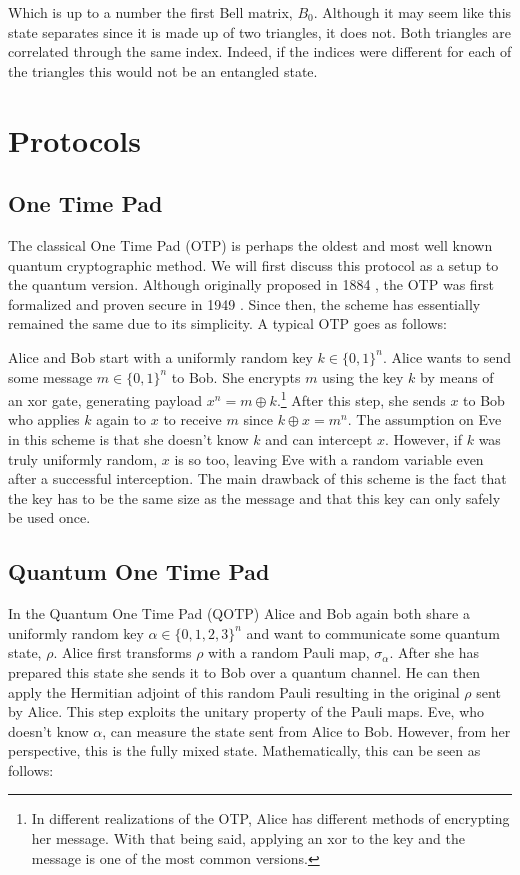 \documentclass[]{article}
\begin{document}
Which is up to a number the first Bell matrix, $B_0$. Although it may seem like this state separates since it is made up of two triangles, it does not. Both triangles are correlated through the same index. Indeed, if the indices were different for each of the triangles this would not be an entangled state.

\section{Protocols}


\subsection{One Time Pad}

The classical One Time Pad (OTP) is perhaps the oldest and most well known quantum cryptographic method. We will first discuss this protocol as a setup to the quantum version. Although originally proposed in 1884 \cite{Markoff2011}, the OTP was first formalized and proven secure in 1949 \cite{Shannon1949}. Since then, the scheme has essentially remained the same due to its simplicity. A typical OTP goes as follows:

Alice and Bob start with a uniformly random key $k \in \{0,1\}^n$. Alice wants to send some message $m \in \{0,1\}^n$ to Bob. She encrypts $m$ using the key $k$ by means of an xor gate, generating payload $x^n = m \oplus k$.\footnote{In different realizations of the OTP, Alice has different methods of encrypting her message. With that being said, applying an xor to the key and the message is one of the most common versions.} After this step, she sends $x$ to Bob who applies $k$ again to $x$ to receive $m$ since $k \oplus x = m^n$. The assumption on Eve in this scheme is that she doesn't know $k$ and can intercept $x$. However, if $k$ was truly uniformly random, $x$ is so too, leaving Eve with a random variable even after a successful interception. The main drawback of this scheme is the fact that the key has to be the same size as the message and that this key can only safely be used once.

\subsection{Quantum One Time Pad}

In the Quantum One Time Pad (QOTP) Alice and Bob again both share a uniformly random key $ \alpha \in \{0,1,2,3\}^n$ and want to communicate some quantum state, $\rho$. Alice first transforms $\rho$ with a random Pauli map, $\sigma_\alpha$. After she has prepared this state she sends it to Bob over a quantum channel. He can then apply the Hermitian adjoint of this random Pauli resulting in the original $\rho$ sent by Alice. This step exploits the unitary property of the Pauli maps. Eve, who doesn't know $\alpha$, can measure the state sent from Alice to Bob. However, from her perspective, this is the fully mixed state. Mathematically, this can be seen as follows:
\end{document}
